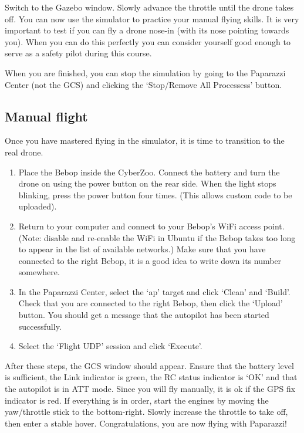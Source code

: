 \documentclass{article}
\begin{document}
Switch to the Gazebo window. Slowly advance the throttle until the drone takes off.
You can now use the simulator to practice your manual flying skills. It is very important to test if you can fly a drone nose-in (with its nose pointing towards you). When you can do this perfectly you can consider yourself good enough to serve as a safety pilot during this course.

When you are finished, you can stop the simulation by going to the Paparazzi Center (not the GCS) and clicking the `Stop/Remove All Processess' button.



\subsection*{Manual flight}
Once you have mastered flying in the simulator, it is time to transition to the real drone.

\begin{enumerate}
\item Place the Bebop inside the CyberZoo. Connect the battery and turn the drone on using the power button on the rear side. When the light stops blinking, press the power button four times. (This allows custom code to be uploaded).
\item Return to your computer and connect to your Bebop's WiFi access point. (Note: disable and re-enable the WiFi in Ubuntu if the Bebop takes too long to appear in the list of available networks.)
Make sure that you have connected to the right Bebop, it is a good idea to write down its number somewhere.
\item In the Paparazzi Center, select the `ap' target and click `Clean' and `Build'. Check that you are connected to the right Bebop, then click the `Upload' button. You should get a message that the autopilot has been started successfully.
\item Select the `Flight UDP' session and click `Execute'.
\end{enumerate}

After these steps, the GCS window should appear.
Ensure that the battery level is sufficient, the Link indicator is green, the RC status indicator is `OK' and that the autopilot is in ATT mode. Since you will fly manually, it is ok if the GPS fix indicator is red.
If everything is in order, start the engines by moving the yaw/throttle stick to the bottom-right. Slowly increase the throttle to take off, then enter a stable hover. Congratulations, you are now flying with Paparazzi!
\end{document}
